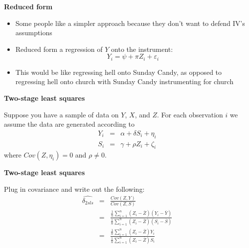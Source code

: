 \documentclass[notes=show]{beamer}
\begin{document}
\begin{frame}[plain]
\begin{center}
\textbf{Reduced form}
\end{center}

\begin{itemize}
\item Some people like a simpler approach because they don't want to defend IV's assumptions
\item Reduced form a regression of $Y$ onto the instrument:$$Y_i=\psi + \pi{Z_i} + \varepsilon_i$$
\item This would be like regressing hell onto Sunday Candy, as opposed to regressing hell onto church with Sunday Candy instrumenting for church
\end{itemize}

\end{frame}






\begin{frame}[plain]
\begin{center}
\textbf{Two-stage least squares}
\end{center}

Suppose you have a sample of data on $Y$, $X$, and $Z$. For each observation $i$ we assume the data are generated according to
		\begin{eqnarray*}
		Y_i &=& \alpha + \delta{S}_i + \eta_i \\
		S_i &=& \gamma + \rho{Z}_i + \zeta_i
		\end{eqnarray*}where $Cov(Z,\eta_i)=0$ and $\rho\neq{0}$.

\end{frame}


\begin{frame}[plain]
\begin{center}
\textbf{Two-stage least squares}
\end{center}

Plug in covariance and write out the following:
		\begin{eqnarray*}
		\widehat{\delta_{2sls}} &=& \frac{Cov(Z,Y)}{Cov(Z,S)} \\
		&=& \frac{ \frac{1}{n}\sum_{i=1}^n(Z_i - \overline{Z})(Y_i - \overline{Y})}{\frac{1}{n}\sum_{i=1}^n(Z_i - \overline{Z})(S_i - \overline{S})} \\
		&=& \frac{ \frac{1}{n} \sum_{i=1}^n(Z_i - \overline{Z})Y_i}{ \frac{1}{n} \sum_{i=1}^n (Z_i-\overline{Z})S_i}
		\end{eqnarray*}

\end{frame}
\end{document}
